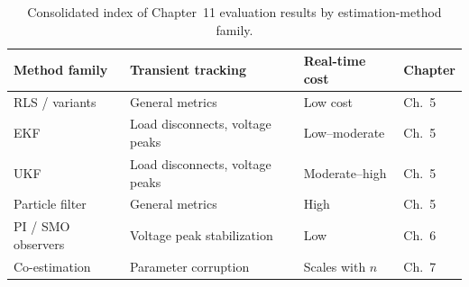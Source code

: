 \begin{table}[htbp]
	\centering
	\caption{Consolidated index of Chapter~11 evaluation results by estimation-method family.}
	\label{tab:ch11_consolidated}
	\renewcommand{\arraystretch}{1.3}
	\begin{tabularx}{\textwidth}{@{}l X X l@{}}
		\toprule
		\textbf{Method family} & \textbf{Transient tracking} & \textbf{Real-time cost} & \textbf{Chapter} \\
		\midrule
		RLS / variants & General metrics & Low cost & Ch.~5 \\
		EKF & Load disconnects, voltage peaks & Low--moderate & Ch.~5 \\
		UKF & Load disconnects, voltage peaks & Moderate--high & Ch.~5 \\
		Particle filter & General metrics & High & Ch.~5 \\
		PI / SMO observers & Voltage peak stabilization & Low & Ch.~6 \\
		Co-estimation & Parameter corruption & Scales with $n$ & Ch.~7 \\
		\bottomrule
	\end{tabularx}
\end{table}